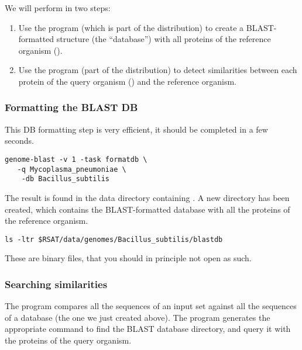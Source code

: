 We will perform in two steps:

\begin{enumerate}
\item Use the program  (which is part of the
   distribution) to create a BLAST-formatted structure
  (the ``database'') with all proteins of the reference organism
  ().
\item Use the program  (part of the 
  distribution) to detect similarities between each protein of the
  query organism () and the reference
  organism.
\end{enumerate}

\subsubsection{Formatting the BLAST DB}

This DB formatting step is very efficient, it should be completed in a
few seconds.

\begin{footnotesize}
\begin{verbatim}
genome-blast -v 1 -task formatdb \
   -q Mycoplasma_pneumoniae \
    -db Bacillus_subtilis 
\end{verbatim}
\end{footnotesize}

The result is found in the data directory containing
. A new directory  has been
created, which contains the BLAST-formatted database with all the
proteins of the reference organism.

\begin{footnotesize}
\begin{verbatim}
ls -ltr $RSAT/data/genomes/Bacillus_subtilis/blastdb
\end{verbatim}
\end{footnotesize}

These are binary files, that you should in principle not open as such.

\subsubsection{Searching similarities}

The program  compares all the sequences of an input
set against all the sequences of a database (the one we just created
above). The program \program{genome-blast} generates the appropriate
\program{blastall} command to find the BLAST database directory, and
query it with the proteins of the query organism.

